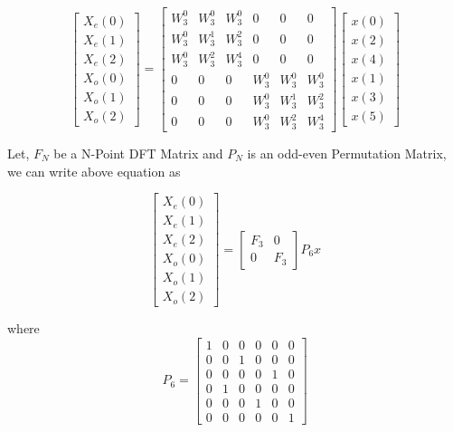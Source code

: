 \documentclass[journal,12pt,twocolumn]{IEEEtran}
\renewcommand\thesection{\arabic{section}}
\begin{document}
\begin{enumerate}[label=\thesection.\arabic*.,ref=\thesection.\theenumi]
\begin{equation}
\begin{bmatrix}
X_{e}(0) \\ 
X_{e}(1) \\ 
X_{e}(2) \\ 
X_{o}(0) \\ 
X_{o}(1) \\ 
X_{o}(2)
\end{bmatrix}
=
\begin{bmatrix}
W^{0}_{3} & W^{0}_{3} & W^{0}_{3} & 0 & 0 & 0\\
W^{0}_{3} & W^{1}_{3} & W^{2}_{3} & 0 & 0 & 0\\
W^{0}_{3} & W^{2}_{3} & W^{4}_{3} & 0 & 0 & 0\\
0 & 0 & 0 & W^{0}_{3} & W^{0}_{3} & W^{0}_{3}\\
0 & 0 & 0 & W^{0}_{3} & W^{1}_{3} & W^{2}_{3}\\
0 & 0 & 0 & W^{0}_{3} & W^{2}_{3} & W^{4}_{3}
\end{bmatrix}
\begin{bmatrix}
x(0) \\ 
x(2) \\ 
x(4) \\ 
x(1) \\ 
x(3) \\ 
x(5) 
\end{bmatrix}   
\end{equation}
    
Let, $F_{N}$ be a N-Point DFT Matrix and $P_{N}$ is an odd-even Permutation Matrix, we can write above equation as

\begin{equation}
\begin{bmatrix}
X_{e}(0) \\ 
X_{e}(1) \\ 
X_{e}(2) \\ 
X_{o}(0) \\ 
X_{o}(1) \\ 
X_{o}(2)
\end{bmatrix}
=
\begin{bmatrix}
F_{3} & 0 \\
0 & F_{3}
\end{bmatrix}
P_{6}
x   
\label{eq:equation6}
\end{equation}


where
\begin{equation}
P_{6} 
=
\begin{bmatrix}
1 & 0 & 0 & 0 & 0 & 0\\
0 & 0 & 1 & 0 & 0 & 0\\
0 & 0 & 0 & 0 & 1 & 0\\
0 & 1 & 0 & 0 & 0 & 0\\
0 & 0 & 0 & 1 & 0 & 0\\
0 & 0 & 0 & 0 & 0 & 1
\end{bmatrix} 
\end{equation}


\end{enumerate}
\end{document}

